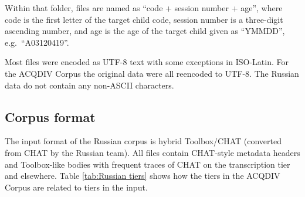 \documentclass[a4paper, 11pt]{book}
\begin{document}
Within that folder, files are named as “code + session number + age”, where code is the first letter of the target child code, session number is a three-digit ascending number, and age is the age of the target child given as “YMMDD”, e.g.\ “A03120419”. 

Most files were encoded as UTF-8 text with some exceptions in ISO-Latin. For the ACQDIV Corpus the original data were all reencoded to UTF-8. The Russian data do not contain any non-ASCII characters. 


\subsection{Corpus format}

The input format of the Russian corpus is hybrid Toolbox/CHAT (converted from CHAT by the Russian team). All files contain CHAT-style metadata headers and Toolbox-like bodies with frequent traces of CHAT on the transcription tier and elsewhere. Table \autoref{tab:Russian tiers} shows how the tiers in the ACQDIV Corpus are related to tiers in the input.
\end{document}
